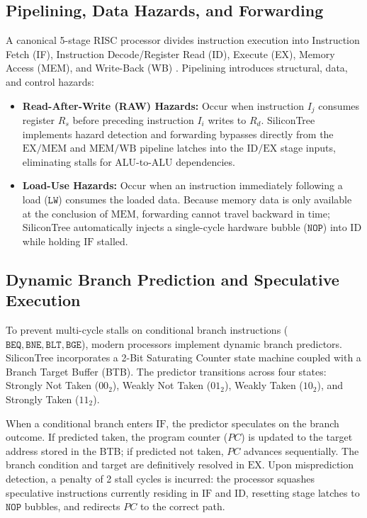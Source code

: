 \documentclass[journal,twocolumn,10pt]{IEEEtran}
\begin{document}
\subsection{Pipelining, Data Hazards, and Forwarding}
A canonical 5-stage RISC processor divides instruction execution into Instruction Fetch (IF), Instruction Decode/Register Read (ID), Execute (EX), Memory Access (MEM), and Write-Back (WB) \cite{hennessy2017}. Pipelining introduces structural, data, and control hazards:
\begin{itemize}
    \item \textbf{Read-After-Write (RAW) Hazards:} Occur when instruction $I_j$ consumes register $R_s$ before preceding instruction $I_i$ writes to $R_d$. SiliconTree implements hazard detection and forwarding bypasses directly from the $\text{EX/MEM}$ and $\text{MEM/WB}$ pipeline latches into the $\text{ID/EX}$ stage inputs, eliminating stalls for ALU-to-ALU dependencies.
    \item \textbf{Load-Use Hazards:} Occur when an instruction immediately following a load ($\texttt{LW}$) consumes the loaded data. Because memory data is only available at the conclusion of $\text{MEM}$, forwarding cannot travel backward in time; SiliconTree automatically injects a single-cycle hardware bubble ($\texttt{NOP}$) into $\text{ID}$ while holding $\text{IF}$ stalled.
\end{itemize}

\subsection{Dynamic Branch Prediction and Speculative Execution}
To prevent multi-cycle stalls on conditional branch instructions ($\texttt{BEQ}, \texttt{BNE}, \texttt{BLT}, \texttt{BGE}$), modern processors implement dynamic branch predictors. SiliconTree incorporates a 2-Bit Saturating Counter state machine coupled with a Branch Target Buffer (BTB). The predictor transitions across four states: Strongly Not Taken ($00_2$), Weakly Not Taken ($01_2$), Weakly Taken ($10_2$), and Strongly Taken ($11_2$).

When a conditional branch enters $\text{IF}$, the predictor speculates on the branch outcome. If predicted taken, the program counter ($PC$) is updated to the target address stored in the BTB; if predicted not taken, $PC$ advances sequentially. The branch condition and target are definitively resolved in $\text{EX}$. Upon misprediction detection, a penalty of 2 stall cycles is incurred: the processor squashes speculative instructions currently residing in $\text{IF}$ and $\text{ID}$, resetting stage latches to $\texttt{NOP}$ bubbles, and redirects $PC$ to the correct path.
\end{document}
